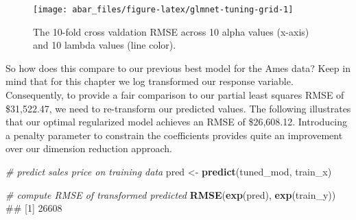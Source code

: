 \documentclass[]{book}
\newenvironment{Shaded}{\begin{snugshade}}{\end{snugshade}}
\newcommand{\CommentTok}[1]{\textcolor[rgb]{0.56,0.35,0.01}{\textit{#1}}}
\newcommand{\DataTypeTok}[1]{\textcolor[rgb]{0.13,0.29,0.53}{#1}}
\newcommand{\DecValTok}[1]{\textcolor[rgb]{0.00,0.00,0.81}{#1}}
\newcommand{\KeywordTok}[1]{\textcolor[rgb]{0.13,0.29,0.53}{\textbf{#1}}}
\newcommand{\NormalTok}[1]{#1}
\newcommand{\OperatorTok}[1]{\textcolor[rgb]{0.81,0.36,0.00}{\textbf{#1}}}
\newcommand{\StringTok}[1]{\textcolor[rgb]{0.31,0.60,0.02}{#1}}
\theoremstyle{definition}
\theoremstyle{definition}
\theoremstyle{definition}
\theoremstyle{remark}
\begin{document}
\begin{Shaded}
\end{Shaded}

\begin{figure}

{\centering \texttt{[image: abar\_files/figure-latex/glmnet-tuning-grid-1]} 

}

\caption{The 10-fold cross valdation RMSE across 10 alpha values (x-axis) and 10 lambda values (line color).}\label{fig:glmnet-tuning-grid}
\end{figure}

So how does this compare to our previous best model for the Ames data?
Keep in mind that for this chapter we log transformed our response
variable. Consequently, to provide a fair comparison to our partial
least squares RMSE of \$31,522.47, we need to re-transform our predicted
values. The following illustrates that our optimal regularized model
achieves an RMSE of \$26,608.12. Introducing a penalty parameter to
constrain the coefficients provides quite an improvement over our
dimension reduction approach.

\begin{Shaded}
\begin{Highlighting}[]
\CommentTok{# predict sales price on training data}
\NormalTok{pred <-}\StringTok{ }\KeywordTok{predict}\NormalTok{(tuned_mod, train_x)}

\CommentTok{# compute RMSE of transformed predicted}
\KeywordTok{RMSE}\NormalTok{(}\KeywordTok{exp}\NormalTok{(pred), }\KeywordTok{exp}\NormalTok{(train_y))}
\NormalTok{## [1] 26608}
\end{Highlighting}
\end{Shaded}
\end{document}
